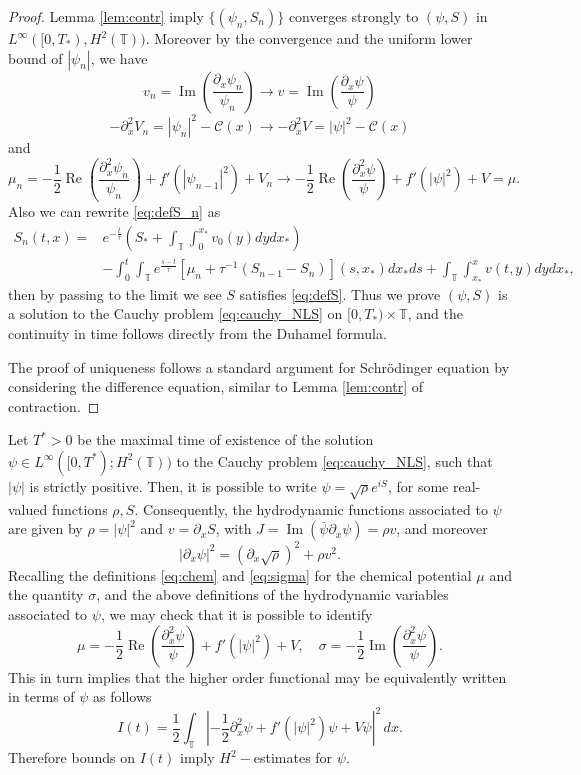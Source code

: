 \documentclass[leqno]{amsart}
\theoremstyle{plain}
\theoremstyle{definition}
\theoremstyle{remark}
\theoremstyle{plain}
\theoremstyle{plain}
\def\T{{\mathbb T}}%
\def\d{{\partial}}
\DeclareMathOperator{\RE}{Re}
\DeclareMathOperator{\IM}{Im}
\numberwithin{equation}{section}
\begin{document}
\begin{proof}
Lemma \ref{lem:contr} imply $\{(\psi_n,S_n)\}$ converges strongly to $(\psi,S)$ in $L^\infty([0,T_*),H^2(\T))$. Moreover by the convergence and the uniform lower bound of $|\psi_n|$, we have
\[
v_n=\IM\left(\frac{\d_x\psi_n}{\psi_n}\right)\to v=\IM\left(\frac{\d_x\psi}{\psi}\right)
\]
\[
-\d_x^2 V_n=|\psi_n|^2-\mathcal{C}(x)\to-\d_x^2 V=|\psi|^2-\mathcal{C}(x)
\]
and
\[
\mu_n=-\frac12\RE\left(\frac{\d_x^2\psi_n}{\psi_n}\right)+f'(|\psi_{n-1}|^2)+V_n\to -\frac12\RE\left(\frac{\d_x^2\psi}{\psi}\right)+f'(|\psi|^2)+V=\mu.
\] 
Also we can rewrite \eqref{eq:defS_n} as
\begin{align*}
S_n(t,x)=&e^{-\frac{t}{\tau}}\left(S_*+\int_\T\int_0^{x_*}v_0(y)dydx_*\right)\\
&-\int_0^t \int_\T e^{\frac{s-t}{\tau}}[\mu_n+\tau^{-1}(S_{n-1}-S_n)](s,x_*)dx_*ds+\int_\T\int_{x_*}^x v(t,y)dydx_*,
\end{align*}
then by passing to the limit we see $S$ satisfies \eqref{eq:defS}. Thus we prove $(\psi,S)$ is a solution to the Cauchy problem \eqref{eq:cauchy_NLS} on $[0,T_*)\times\T$, and the continuity in time follows directly from the Duhamel formula.

The proof of uniqueness follows a standard argument for Schr\"odinger equation by considering the difference equation, similar to Lemma \ref{lem:contr} of contraction.
\end{proof}

Let $T^*>0$ be the maximal time of existence of the solution $\psi\in L^\infty([0,T^*);H^2(\T))$ to the Cauchy problem \eqref{eq:cauchy_NLS}, such that $|\psi|$ is strictly positive. Then, it is possible to write $\psi=\sqrt{\rho}e^{iS}$, for some real-valued functions $\rho, S$. Consequently, the hydrodynamic functions associated to $\psi$ are given by $\rho=|\psi|^2$ and $v=\d_xS$, with $J=\IM(\bar\psi\d_x\psi)=\rho v$, and moreover
\[
|\d_x\psi|^2=(\d_x\sqrt\rho)^2+\rho v^2.
\]
Recalling the definitions \eqref{eq:chem} and \eqref{eq:sigma} for the chemical potential $\mu$ and the quantity $\sigma$, and the above definitions of the hydrodynamic variables associated to $\psi$, we may check that it is possible to identify
\begin{equation}\label{eq:mu_psi}
\mu=-\frac12\RE\left(\frac{\d_x^2\psi}{\psi}\right)+f'(|\psi|^2)+V,\quad\sigma=-\frac12\IM\left(\frac{\d_x^2\psi}{\psi}\right).
\end{equation}
This in turn implies that the higher order functional may be equivalently written in terms of $\psi$ as follows
\begin{equation}\label{eq:high_psi}
I(t)=\frac12\int_{\mathbb T}
\left|-\frac12\d_x^2\psi+f'(|\psi|^2)\psi+V\psi\right|^2\,dx.
\end{equation}
Therefore bounds on $I(t)$ imply $H^2-$estimates for $\psi$.
\end{document}
